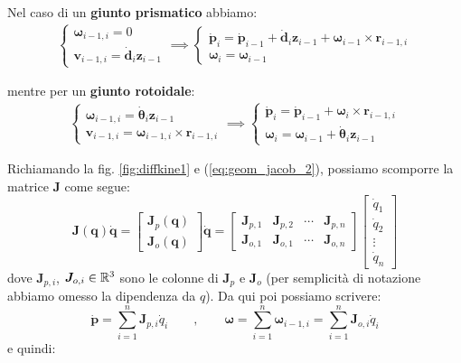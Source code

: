 Nel caso di un \textbf{giunto prismatico} abbiamo:
\begin{align*}
	\begin{cases}
		\bm{\omega}_{i-1,i} = 0 \\ 
		\bm{v}_{i-1, i} = \dot{\bm{d}}_i\bm{z}_{i-1}
	\end{cases}
	\implies
	\begin{cases}
		\bm{\dot{p}}_i = \bm{\dot{p}}_{i-1} + \dot{\bm{d}}_i\bm{z}_{i-1} + \bm{\omega}_{i-1} \times \bm{r}_{i-1, i} \\
		\bm{\omega}_i = \bm{\omega}_{i-1}
	\end{cases}
\end{align*}

mentre per un \textbf{giunto rotoidale}:
\begin{align*}
	\begin{cases}
		\bm{\omega}_{i-1,i} = \dot{\bm{\theta}}_i\bm{z}_{i-1} \\ 
		\bm{v}_{i-1, i} = \bm{\omega}_{i-1,i} \times \bm{r}_{i-1, i}
	\end{cases}
	\implies
	\begin{cases}
		\bm{\dot{p}}_i = \bm{\dot{p}}_{i-1} + \bm{\omega}_{i} \times \bm{r}_{i-1, i} \\
		\bm{\omega}_i = \bm{\omega}_{i-1} + \dot{\bm{\theta}}_i\bm{z}_{i-1}
	\end{cases}
\end{align*}


Richiamando la fig. \ref{fig:diffkine1} e (\ref{eq:geom_jacob_2}), possiamo scomporre la matrice $\bm{J}$ come segue:
$$
\bm{J}(\bm{q})\dot{\bm{q}}
=
\begin{bmatrix*}
	\bm{J}_p(\bm{q}) \\
	\bm{J}_o(\bm{q}) 
\end{bmatrix*}
\dot{\bm{q}}
=
\begin{bmatrix*}
	\bm{J}_{p,1} & \bm{J}_{p,2} & \cdots & \bm{J}_{p,n} \\
	\bm{J}_{o,1} & \bm{J}_{o,1} & \cdots & \bm{J}_{o,n}
\end{bmatrix*}
\begin{bmatrix*}
	\dot{q}_1 \\ \dot{q}_2 \\ \vdots \\ \dot{q}_n
\end{bmatrix*}
$$
dove $\bm{J}_{p,i}$, $\bm{J}_{o,i} \in \mathbb{R}^3$ sono le colonne di $\bm{J}_p$ e $\bm{J}_o$ (per semplicità di notazione abbiamo omesso la dipendenza da $q$). Da qui poi possiamo scrivere:
$$
\bm{\dot{p}} = \sum_{i=1}^n \bm{J}_{p,i} \dot{q}_i
\qquad , \qquad
\bm{\omega} = \sum_{i=1}^n \bm{\omega}_{i-1, i} = \sum_{i=1}^n \bm{J}_{o,i} \dot{q}_i
$$
e quindi:

